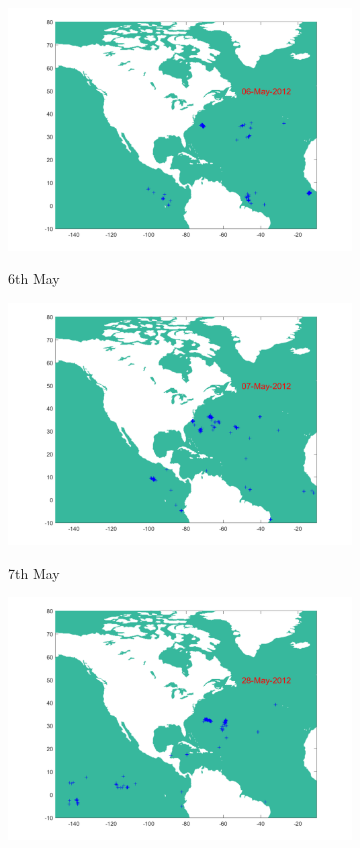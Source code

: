 \documentclass[letterpaper,12pt,peerreviewca,draftcls]{IEEEtran}
\begin{document}
\begin{figure}
    	\centering
	\captionsetup[subfigure]{aboveskip = -12pt}
    	\begin{subfigure}[t]{0.49\textwidth}
		\includegraphics[width=\linewidth]{"Figure 14a"}
		\label{fig:May6 }
		\caption{6th May}
	\end{subfigure}
	\begin{subfigure}[t]{0.49\textwidth}
		\includegraphics[width=\linewidth]{"Figure 14b"}
		\label{fig:May7}
		\caption{7th May}
	\end{subfigure}
	\begin{subfigure}[t]{0.49\textwidth}
		\includegraphics[width=\linewidth]{"Figure 14c"}

\end{subfigure}
\end{figure}
\end{document}
